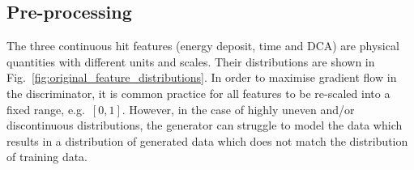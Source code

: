 


\subsection{Pre-processing}
The three continuous hit features (energy deposit, time and DCA) are physical quantities with different units and scales. Their distributions are shown in Fig.~\ref{fig:original_feature_distributions}. In order to maximise gradient flow in the discriminator, it is common practice for all features to be re-scaled into a fixed range, e.g.\ $[0, 1]$. However, in the case of highly uneven and/or discontinuous distributions, the generator can struggle to model the data which results in a distribution of generated data which does not match the distribution of training data.

